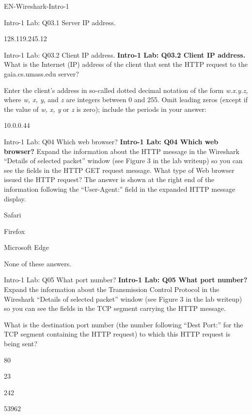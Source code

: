 \documentclass[a4paper]{article}
\begin{document}
\begin{quiz}{EN-Wireshark-Intro-1}
\begin{shortanswer}[points=1]{Intro-1 Lab: Q03.1 Server IP address.}
\item 128.119.245.12
\end{shortanswer}

\begin{shortanswer}[points=1]{Intro-1 Lab: Q03.2 Client IP address.}
\textbf{Intro-1 Lab: Q03.2 Client IP address.}  
What is the Internet (IP) address of the client that sent the HTTP request to the gaia.cs.umass.edu server? 

Enter the client's address in so-called dotted decimal notation of the form \emph{w.x.y.z,} where \emph{w, x, y}, and \emph{z} are integers between 0 and 255. Omit leading zeros (except if the value of \emph{w, x, y} or \emph{z} is zero); include the periods in your answer:    

\item 10.0.0.44
\end{shortanswer}

\begin{multi}[points=1]{Intro-1 Lab: Q04 Which web browser?}
\textbf{Intro-1 Lab: Q04 Which web browser?}  
Expand the information about the HTTP message in the Wireshark ``Details of selected packet'' window (see Figure 3 in the lab writeup) so you can see the fields in the HTTP GET request message. What type of Web browser issued the HTTP request? The answer is shown at the right end of the information following the ``User-Agent:'' field in the expanded HTTP message display.

\item Safari
\item* Firefox
\item Microsoft Edge
\item None of these answers.
\end{multi}

\begin{multi}[points=1]{Intro-1 Lab: Q05 What port number?}
\textbf{Intro-1 Lab: Q05 What port number?} 
Expand the information about the Transmission Control Protocol in the Wireshark ``Details of selected packet'' window (see Figure 3 in the lab writeup) so you can see the fields in the TCP segment carrying the HTTP message.  

What is the destination port number (the number following ``Dest Port:'' for the TCP segment containing the HTTP request) to which this HTTP request is being sent? 

\item* 80
\item 23
\item 242
\item 53962
\end{multi}

\end{quiz}
\end{document}
